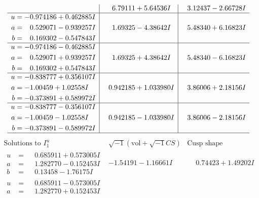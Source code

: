 \documentclass[1p]{elsarticle_modified}
\theoremstyle{definition}
\newcommand{\I}{\sqrt{-1}}
\begin{document}
$$\begin{array}{c|c|c}
 & \phantom{-}6.79111 + 5.64536 I & \phantom{-}3.12437 - 2.66728 I \\ \hline\begin{aligned}
u &= -0.974186 + 0.462885 I \\
a &= \phantom{-}0.529071 - 0.939257 I \\
b &= \phantom{-}0.169302 - 0.547843 I\end{aligned}
 & \phantom{-}1.69325 - 4.38642 I & \phantom{-}5.48340 + 6.16823 I \\ \hline\begin{aligned}
u &= -0.974186 - 0.462885 I \\
a &= \phantom{-}0.529071 + 0.939257 I \\
b &= \phantom{-}0.169302 + 0.547843 I\end{aligned}
 & \phantom{-}1.69325 + 4.38642 I & \phantom{-}5.48340 - 6.16823 I \\ \hline\begin{aligned}
u &= -0.838777 + 0.356107 I \\
a &= -1.00459 + 1.02558 I \\
b &= -0.373891 + 0.589972 I\end{aligned}
 & \phantom{-}0.942185 + 1.033980 I & \phantom{-}3.86006 + 2.18156 I \\ \hline\begin{aligned}
u &= -0.838777 - 0.356107 I \\
a &= -1.00459 - 1.02558 I \\
b &= -0.373891 - 0.589972 I\end{aligned}
 & \phantom{-}0.942185 - 1.033980 I & \phantom{-}3.86006 - 2.18156 I\\
 \hline 
 \end{array}$$\newpage$$\begin{array}{c|c|c}  
\text{Solutions to }I^u_{1}& \I (\text{vol} + \sqrt{-1}CS) & \text{Cusp shape}\\
 \hline 
\begin{aligned}
u &= \phantom{-}0.685911 + 0.573005 I \\
a &= \phantom{-}1.282770 - 0.152453 I \\
b &= \phantom{-}0.13458 - 1.76175 I\end{aligned}
 & -1.54191 - 1.16661 I & \phantom{-}0.74423 + 1.49202 I \\ \hline\begin{aligned}
u &= \phantom{-}0.685911 - 0.573005 I \\
a &= \phantom{-}1.282770 + 0.152453 I \\

\end{aligned}
\end{array}$$
\end{document}
